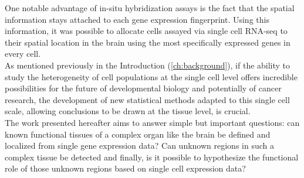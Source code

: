 One notable advantage of in-situ hybridization assays is the fact that the spatial information stays attached to each gene expression fingerprint. Using this information, it was possible to allocate cells assayed via single cell RNA-seq to their spatial location in the brain using the most specifically expressed genes in every cell. \\

As mentioned previously in the Introduction (\ref{ch:background}), if the ability to study the heterogeneity of cell populations at the single cell level offers incredible possibilities for the future of developmental biology and potentially of cancer research, the development of new statistical methods adapted to this single cell scale, allowing conclusions to be drawn at the tissue level, is crucial.\\

The work presented hereafter aims to answer simple but important questions: can known functional tissues of a complex organ like the brain be defined and localized from single gene expression data? Can unknown regions in such a complex tissue be detected and finally, is it possible to hypothesize the functional role of those unknown regions based on single cell expression data?



